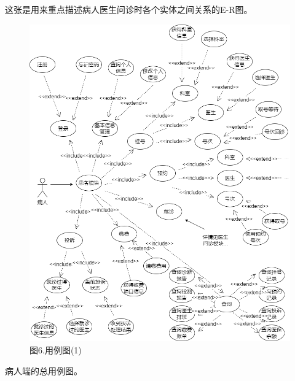 \documentclass[24pt,a4paper]{article}%
\begin{document}
这张是用来重点描述病人医生问诊时各个实体之间关系的E-R图。
\begin{figure}[H]
    \centering
    \includegraphics[width=1\textwidth]{image/example1.png}
    \caption*{图6.用例图(1)}
\end{figure}
病人端的总用例图。
\end{document}
